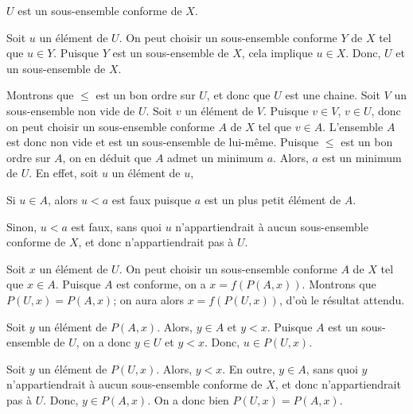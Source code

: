 \blank[medium]

\noindent{} $U$ est un sous-ensemble conforme de $X$.

\blank[medium]

\noindent{} 
    \startitemize
        \item Soit $u$ un élément de $U$. 
            On peut choisir un sous-ensemble conforme $Y$ de $X$ tel que $u \in Y$. 
            Puisque $Y$ est un sous-ensemble de $X$, cela implique $u \in X$.
            Donc, $U$ et un sous-ensemble de $X$. 
        \item Montrons que $\leq$ est un bon ordre sur $U$, et donc que $U$ est une chaine.
            Soit $V$ un sous-ensemble non vide de $U$. 
            Soit $v$ un élément de $V$. 
            Puisque $v \in V$, $v \in U$, donc on peut choisir un sous-ensemble conforme $A$ de $X$ tel que $v \in A$.
            L'ensemble $A$ est donc non vide et est un sous-ensemble de lui-même.
            Puisque $\leq$ est un bon ordre sur $A$, on en déduit que $A$ admet un minimum $a$.
            Alors, $a$ est un minimum de $U$.
            En effet, soit $u$ un élément de $u$, 
            \startitemize[nowhite]
                \item Si $u \in A$, alors $u < a$ est faux puisque $a$ est un plus petit élément de $A$.
                \item Sinon, $u < a$ est faux, sans quoi $u$ n'appartiendrait à aucun sous-ensemble conforme de $X$, et donc n'appartiendrait pas à $U$.
            \stopitemize
        \item Soit $x$ un élément de $U$.
            On peut choisir un sous-ensemble conforme $A$ de $X$ tel que $x \in A$. 
            Puisque $A$ est conforme, on a $x = f(P(A,x))$.
            Montrons que $P(U, x) = P(A, x)$; on aura alors $x = f(P(U,x))$, d'où le résultat attendu.
            \startitemize[nowhite]
                \item Soit $y$ un élément de $P(A, x)$.
                    Alors, $y \in A$ et $y < x$.
                    Puisque $A$ est un sous-ensemble de $U$, on a donc $y \in U$ et $y < x$.
                    Donc, $u \in P(U, x)$.
                \item Soit $y$ un élément de $P(U, x)$.
                    Alors, $y < x$.
                    En outre, $y \in A$, sans quoi $y$ n'appartiendrait à aucun sous-ensemble conforme de $X$, et donc n'appartiendrait pas à $U$. 
                    Donc, $y \in P(A, x)$.
            \stopitemize
            On a donc bien $P(U,x) = P(A,x)$.
    \stopitemize

